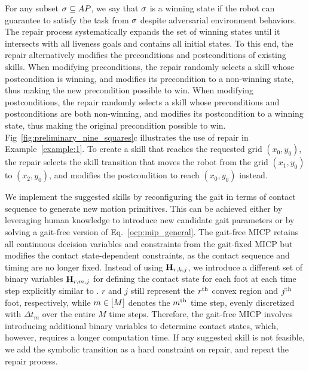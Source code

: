 \documentclass[letterpaper, 10 pt, conference]{ieeeconf}
\begin{document}

For any subset $\sigma\subseteq AP$, we say that $\sigma$ is a winning state
if the robot can guarantee to satisfy the task from $\sigma$
despite adversarial environment behaviors.
The repair process systematically expands the set of winning states until
it intersects with all liveness goals and contains all initial states.
To this end, the repair alternatively modifies the preconditions and postconditions of existing skills.
When modifying preconditions, the repair randomly selects a skill whose postcondition is winning, and modifies its precondition to a non-winning state, thus making the new precondition possible to win.
When modifying postconditions, the repair randomly selects a skill whose preconditions and postconditions are both non-winning, and modifies its postcondition to a winning state, thus making the original precondition possible to win.
%
Fig~\ref{fig:preliminary_nine_squares}c illustrates the use of repair in Example~\ref{example:1}. 
To create a skill that reaches the requested grid $(x_0, y_0)$, the
repair selects the skill transition that moves the robot from the grid $(x_1, y_0)$ to $(x_2, y_0)$,
and modifies the postcondition to reach $(x_0, y_0)$ instead.

We implement the suggested skills by reconfiguring the gait in terms of contact sequence to generate new motion primitives. This can be achieved either by leveraging human knowledge to introduce new candidate gait parameters or by solving a gait-free version of Eq.~\ref{ocp:mip_general}. The gait-free MICP retains all continuous decision variables and constraints from the gait-fixed MICP but modifies the contact state-dependent constraints, as the contact sequence and timing are no longer fixed. Instead of using $\mathbf{H}_{r,k,j}$, we introduce a different set of binary variables $\mathbf{H}_{r,m,j}$ for defining the contact state for each foot at each time step explicitly similar to \cite{valenzuela2016mixed}. $r$ and $j$ still represent the $r^{\rm th}$ convex region and $j^{\rm th}$ foot, respectively, while $m \in [M]$ denotes the $m^{\rm th}$ time step, evenly discretized with $\Delta t_m$ over the entire $M$ time steps. Therefore, the gait-free MICP involves introducing additional binary variables to determine contact states, which, however, requires a longer computation time.
If any suggested skill is not feasible, 
we add the symbolic transition as a hard constraint on repair,
and repeat the repair process.
\end{document}
